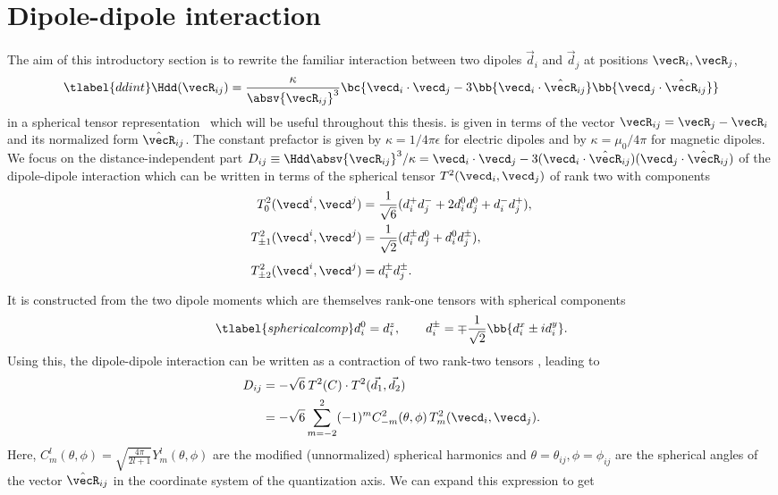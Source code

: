 \section{Dipole-dipole interaction}
The aim of this introductory section is to rewrite the familiar interaction between two dipoles $\vec{d}_i$ and $\vec{d}_j$ at positions $\vecR_i, \vecR_j$,
\begin{align} \tlabel{ddint}
\Hdd(\vecR_{ij}) = \frac{\kappa}{\absv{\vecR_{ij}}^3} \bc{ \vecd_i \cdot \vecd_j -3 \bb{ \vecd_i \cdot \hat{\vecR}_{ij} }\bb{ \vecd_j \cdot \hat{\vecR}_{ij} } }
\end{align}
in a spherical tensor representation~\cite{Micheli2007,Gorshkov2011c} which will be useful throughout this thesis.
 is given in terms of the vector $\vecR_{ij} = \vecR_j - \vecR_i$ and its normalized form $\hat{\vecR}_{ij}$.
The constant prefactor is given by $\kappa = 1/4\pi\epsilon$ for electric dipoles and by
$\kappa = \mu_0 / 4\pi$ for magnetic dipoles.
We focus on the distance-independent part $D_{ij} \equiv \Hdd \absv{\vecR_{ij}}^3/\kappa=\vecd_i \cdot \vecd_j -3 (\vecd_i \cdot \hat{\vecR}_{ij})(\vecd_j \cdot \hat{\vecR}_{ij})$ of the dipole-dipole interaction which can be written in terms of the spherical tensor $T^2(\vecd_i, \vecd_j)$ of rank two with components
\begin{align}
T^2_0(\vecd^i, \vecd^j) &= \frac{1}{\sqrt{6}} (d_i^+ d_j^- + 2d_i^0 d_j^0 + d_i^{-} d_j^{+}), \\
T^2_{\pm 1}(\vecd^i, \vecd^j) &= \frac{1}{\sqrt{2}} (d_i^{\pm} d_j^0 + d_i^0 d_j^{\pm}), \\
T^2_{\pm 2}(\vecd^i, \vecd^j) &= d_i^{\pm} d_j^{\pm} \vphantom{\frac{1}{42}}.
\end{align}
It is constructed from the two dipole moments which are themselves rank-one tensors with spherical components
\begin{align} \tlabel{sphericalcomp}
d^0_i = d^z_i, \qquad d_i^\pm = \mp\frac{1}{\sqrt{2}}\bb{d_i^x\pm i d_i^y}.
\end{align}
Using this, the dipole-dipole interaction can be written as a contraction of two rank-two tensors \cite{Brown2003}, leading to
\begin{align}
    D_{ij} &= -\sqrt{6} \: T^2(C)\cdot T^2(\vec{d_1},\vec{d_2})\\
           &= -\sqrt{6}  \sum_{m=-2}^{2} (-1)^m C^2_{-m}(\theta,\phi) \, T^2_m(\vecd_i,\vecd_j).
\end{align}
Here, $C^l_m(\theta,\phi)=\sqrt{\frac{4\pi}{2l+1}} Y^l_m(\theta,\phi)$ are the modified (unnormalized) spherical harmonics and $\theta = \theta_{ij}, \phi = \phi_{ij}$ are the spherical angles of the vector $\hat{\vecR}_{ij}$ in the coordinate system of the quantization axis. We can expand this expression to get
